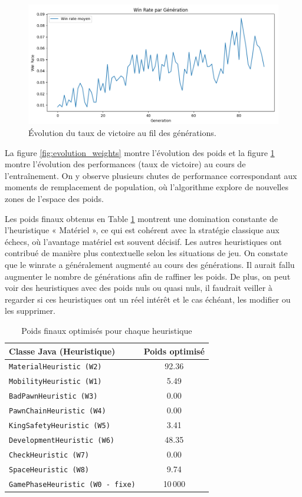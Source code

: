 \documentclass{article}
\begin{document}
\begin{figure}[H]
    \centering
    \includegraphics[width=\textwidth]{AG_winrate.png}
    \caption{Évolution du taux de victoire au fil des générations.}
    \label{fig:evolution_winrate}
  \end{figure}
  \FloatBarrier

La figure \ref{fig:evolution_weights} montre l'évolution des poids et la figure \ref{fig:evolution_winrate} montre l'évolution des performances (taux de victoire) au cours de l'entraînement. On y observe plusieurs chutes de performance correspondant aux moments de remplacement de population, où l'algorithme explore de nouvelles zones de l'espace des poids.

Les poids finaux obtenus en Table \ref{tab:poids-heuristiques} montrent une domination constante de l'heuristique « Matériel », ce qui est cohérent avec la stratégie classique aux échecs, où l'avantage matériel est souvent décisif. Les autres heuristiques ont contribué de manière plus contextuelle selon les situations de jeu.
On constate que le winrate a généralement augmenté au cours des générations. Il aurait fallu augmenter le nombre de générations afin de raffiner les poids. De plus, on peut
voir des heuristiques avec des poids nuls ou quasi nuls, il faudrait veiller à regarder si ces heuristiques ont un réel intérêt et le cas échéant, les modifier ou les supprimer.
\begin{table}[H]
    \centering
    \caption{Poids finaux optimisés pour chaque heuristique}
    \label{tab:poids-heuristiques}
    \begin{tabular}{|l|c|}
      \hline
      \textbf{Classe Java (Heuristique)} & \textbf{Poids optimisé} \\
      \hline
      \texttt{MaterialHeuristic (W2)} & 92.36\\
      \texttt{MobilityHeuristic (W1)} & 5.49\\
      \texttt{BadPawnHeuristic (W3)} & 0.00\\
      \texttt{PawnChainHeuristic (W4)} & 0.00\\
      \texttt{KingSafetyHeuristic (W5)} & 3.41\\
      \texttt{DevelopmentHeuristic (W6)} & 48.35\\
      \texttt{CheckHeuristic (W7)} & 0.00 \\
      \texttt{SpaceHeuristic (W8)} & 9.74 \\
      \texttt{GamePhaseHeuristic (W0 - fixe)} & 10\,000 \\
      \hline
    \end{tabular}
  \end{table}
\end{document}

